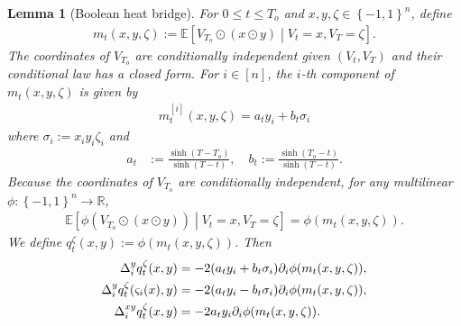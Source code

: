 \documentclass[11pt]{article}
\newcommand{\flip}{\varsigma}
\newcommand{\uV}{V}
\newcommand{\To}{{T_o}}
\theoremstyle{named}
\theoremstyle{plain}
\newtheorem{lemma}{Lemma}
\newcommand{\defn}{:=}
\newcommand{\real}{\ensuremath{\mathbb{R}}}
\newcommand{\Exs}{\ensuremath{{\mathbb{E}}}}
\newcommand{\brackets}[1]{\left[ #1 \right]}
\newcommand{\braces}[1]{\left\{ #1 \right \}}
\begin{document}
\begin{lemma}[Boolean heat bridge]
  \label{lem:boolean_bridge_formula}
  For $0 \leq t \leq \To$ and $x, y, \zeta \in \braces{-1,1}^n$, define
\begin{align}
  \label{eq:def_m}
  m_{t}(x, y, \zeta) \defn \Exs\brackets{\uV_{\To} \odot (x \odot y) \middle| \uV_t = x, \uV_{T} = \zeta}.
\end{align}
The coordinates of $\uV_{\To}$ are conditionally independent given $(\uV_t, \uV_{T})$ and their conditional law has a closed form. For $i \in [n]$, the $i$-th component of $m_{t}(x, y, \zeta)$ is given by  
  \begin{align*}
     m_{t}^{[i]}(x, y, \zeta) = a_{t} y_i + b_{t} \sigma_i
  \end{align*}
  where $\sigma_i \defn x_i y_i \zeta_i$ and
  \begin{align}
    \label{eq:def_a_b}
    a_{t} &\defn \frac{\sinh(T-\To)}{\sinh(T-t)}, \quad b_{t} \defn \frac{\sinh(\To-t)}{\sinh(T-t)}.
  \end{align}
  Because the coordinates of $\uV_{\To}$ are conditionally independent, for any multilinear $\phi:\braces{-1,1}^n \to \real$,
  \begin{align*}
    \Exs\brackets{\phi(\uV_\To \odot (x \odot y))  \middle| \uV_t = x, \uV_T = \zeta} = \phi(m_{t}(x, y, \zeta)).
  \end{align*}
  We define $q_t^{\zeta}(x, y) \defn \phi(m_{t}(x, y, \zeta))$. Then
  \begin{align}
    \label{eq:q_t_derivative}
    \Delta_i^y q_t^{\zeta}(x, y) &= -2 (a_t y_i + b_t \sigma_i) \partial_i \phi(m_{t}(x, y, \zeta)), \notag \\
    \Delta_i^y q_t^{\zeta}(\flip_i(x), y) &= -2 (a_t y_i - b_t \sigma_i) \partial_i \phi(m_{t}(x, y, \zeta)), \notag \\
    \Delta_{i}^{xy} q_t^{\zeta}(x, y) &= -2 a_t y_i \partial_i \phi(m_{t}(x, y, \zeta)).
  \end{align}
\end{lemma}
\end{document}
